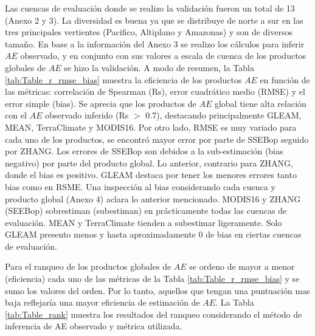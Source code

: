 \documentclass[12pt]{article}
\begin{document}
Las cuencas de evaluación donde se realizo la validación fueron un total de 13 (Anexo 2 y 3). La diversidad es buena ya que se distribuye de norte a sur en las tres principales vertientes (Pacifico, Altiplano y Amazonas) y son de diversos tamaño. En base a la información del Anexo 3 se realizo los cálculos para inferir $AE$ observado, y en conjunto con sus valores a escala de cuenca de los productos globales de $AE$ se hizo la validación. A modo de resumen, la Tabla \ref{tab:Table_r_rmse_bias} muestra la eficiencia de los productos $AE$ en función de las métricas: correlación de Spearman (Rs), error cuadrático medio (RMSE) y el error simple (bias). Se aprecia que los productos de $AE$ global tiene alta relación con el $AE$ observado inferido (Rs $>$ 0.7), destacando principalmente GLEAM, MEAN, TerraClimate y MODIS16. Por otro lado, RMSE es muy variado para cada uno de los productos, se encontró mayor error por parte de SSEBop seguido por ZHANG. Los errores de SSEBop son debidos a la sub-estimación (bias negativo) por parte del producto global. Lo anterior, contrario para ZHANG, donde el bias es positivo. GLEAM destaca por tener los menores errores tanto bias como en RSME. Una inspección al bias considerando cada cuenca y producto global (Anexo 4) aclara lo anterior mencionado. MODIS16 y ZHANG (SEEBop) sobrestiman (subestiman) en prácticamente todas las cuencas de evaluación. MEAN y TerraClimate tienden a subestimar ligeramente. Solo GLEAM presento menos y hasta aproximadamente 0 de bias en ciertas cuencas de evaluación.



Para el ranqueo de los productos globales de $AE$ se ordeno de mayor a menor (eficiencia) cada uno de las métricas de la Tabla \ref{tab:Table_r_rmse_bias} y se sumo los valores del orden. Por lo tanto, aquellos que tengan una puntuación mas baja reflejaría una mayor eficiencia de estimación de $AE$. La Tabla \ref{tab:Table_rank} muestra los resultados del ranqueo considerando el método de inferencia de AE observado y métrica utilizada. 


\end{document}
